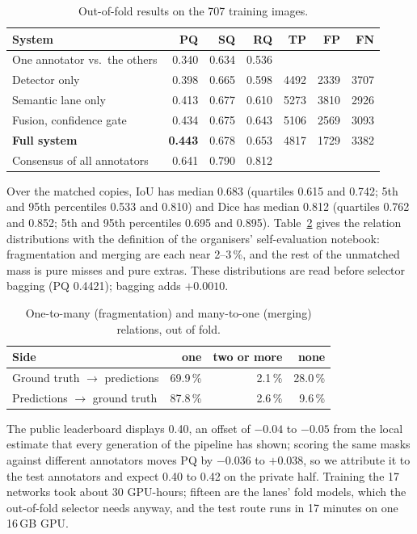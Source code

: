\documentclass[sigconf]{acmart}
\begin{document}
\begin{table}[t]
  \caption{Out-of-fold results on the 707 training images.}
  \label{tab:results}
  \small\setlength{\tabcolsep}{4.2pt}
  \begin{tabular}{@{}lrrrrrr@{}}
    \toprule
    System & PQ & SQ & RQ & TP & FP & FN \\
    \midrule
    One annotator vs.\ the others & 0.340 & 0.634 & 0.536 & & & \\
    Detector only & 0.398 & 0.665 & 0.598 & 4492 & 2339 & 3707 \\
    Semantic lane only & 0.413 & 0.677 & 0.610 & 5273 & 3810 & 2926 \\
    Fusion, confidence gate & 0.434 & 0.675 & 0.643 & 5106 & 2569 & 3093 \\
    \textbf{Full system} & \textbf{0.443} & 0.678 & 0.653 & 4817 & 1729 & 3382 \\
    Consensus of all annotators & 0.641 & 0.790 & 0.812 & & & \\
    \bottomrule
  \end{tabular}
\end{table}

Over the matched copies, IoU has median 0.683 (quartiles 0.615 and 0.742; 5th and 95th percentiles 0.533 and 0.810) and Dice has median 0.812 (quartiles 0.762 and 0.852; 5th and 95th percentiles 0.695 and 0.895). Table~\ref{tab:relations} gives the relation distributions with the definition of the organisers' self-evaluation notebook: fragmentation and merging are each near 2--3\,\%, and the rest of the unmatched mass is pure misses and pure extras. These distributions are read before selector bagging (PQ 0.4421); bagging adds $+0.0010$.

\begin{table}[t]
  \caption{One-to-many (fragmentation) and many-to-one (merging) relations, out of fold.}
  \label{tab:relations}
  \small
  \begin{tabular}{@{}lrrr@{}}
    \toprule
    Side & one & two or more & none \\
    \midrule
    Ground truth $\rightarrow$ predictions & 69.9\,\% & 2.1\,\% & 28.0\,\% \\
    Predictions $\rightarrow$ ground truth & 87.8\,\% & 2.6\,\% & 9.6\,\% \\
    \bottomrule
  \end{tabular}
\end{table}

The public leaderboard displays 0.40, an offset of $-0.04$ to $-0.05$ from the local estimate that every generation of the pipeline has shown; scoring the same masks against different annotators moves PQ by $-0.036$ to $+0.038$, so we attribute it to the test annotators and expect 0.40 to 0.42 on the private half. Training the 17 networks took about 30 GPU-hours; fifteen are the lanes' fold models, which the out-of-fold selector needs anyway, and the test route runs in 17 minutes on one 16\,GB GPU.
\end{document}
